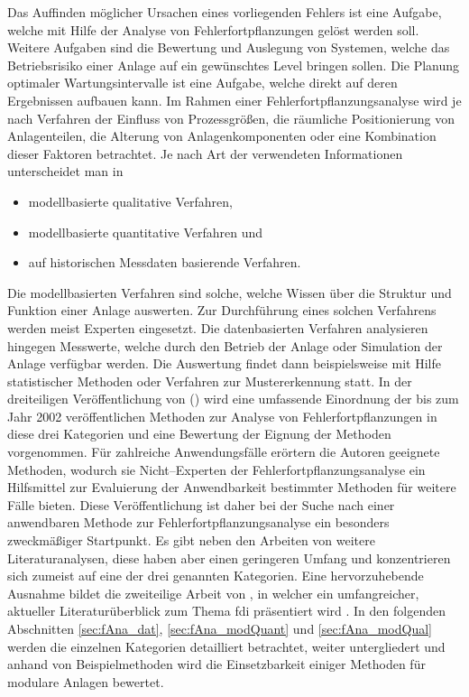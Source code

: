 Das Auffinden m\"oglicher Ursachen eines vorliegenden Fehlers ist eine Aufgabe, welche mit Hilfe der Analyse von Fehlerfortpflanzungen gel\"ost werden soll. Weitere Aufgaben sind die Bewertung und Auslegung von Systemen, welche das Betriebsrisiko einer Anlage auf ein gew\"unschtes Level bringen sollen. Die Planung optimaler Wartungsintervalle ist eine Aufgabe, welche direkt auf deren Ergebnissen aufbauen kann. \newline
Im Rahmen einer Fehlerfortpflanzungsanalyse wird je nach Verfahren der Einfluss von Prozessgr\"o\ss{}en, die r\"aumliche Positionierung von Anlagenteilen, die Alterung von Anlagenkomponenten oder eine Kombination dieser Faktoren betrachtet. Je nach Art der verwendeten Informationen unterscheidet man in \begin{itemize}
\item modellbasierte qualitative Verfahren,
\item modellbasierte quantitative Verfahren und 
\item auf historischen Messdaten basierende Verfahren. 
\end{itemize} 
Die modellbasierten Verfahren sind solche, welche Wissen \"uber die Struktur und Funktion einer Anlage auswerten. Zur Durchf\"uhrung eines solchen Verfahrens werden meist Experten eingesetzt. Die datenbasierten Verfahren analysieren hingegen Messwerte, welche durch den Betrieb der Anlage oder Simulation der Anlage verf\"ugbar werden. Die Auswertung findet dann beispielsweise mit Hilfe statistischer Methoden oder Verfahren zur Mustererkennung statt. \newline
In der dreiteiligen Ver\"offentlichung von \citeauthor{Venkatasubramanian_2003} (\cite{Venkatasubramanian_2003, Venkatasubramanian_2003a,Venkatasubramanian_2003b}) wird eine umfassende Einordnung der bis zum Jahr 2002 ver\"offentlichen Methoden zur Analyse von Fehlerfortpflanzungen in diese drei Kategorien und eine Bewertung der Eignung der Methoden vorgenommen. F\"ur zahlreiche Anwendungsf\"alle er\"ortern die Autoren geeignete Methoden, wodurch sie {Nicht--Ex}perten der Fehlerfortpflanzungsanalyse ein Hilfsmittel zur Evaluierung der Anwendbarkeit bestimmter Methoden f\"ur weitere F\"alle bieten. Diese Ver\"offentlichung ist daher bei der Suche nach einer anwendbaren Methode zur Fehlerfortpflanzungsanalyse ein besonders zweckm\"a\ss{}iger Startpunkt. Es gibt neben den Arbeiten von \citeauthor{Venkatasubramanian_2003} weitere Literaturanalysen, diese haben aber einen geringeren Umfang und konzentrieren sich zumeist auf eine der drei genannten Kategorien. Eine hervorzuhebende Ausnahme bildet die zweiteilige Arbeit von \citeauthor{Gao_2015}, in welcher ein umfangreicher, aktueller Literatur\"uberblick zum Thema \ac{fdi} pr\"asentiert wird \cite{Gao_2015,Gao_2015a}. \newline
In den folgenden Abschnitten \ref{sec:fAna_dat}, \ref{sec:fAna_modQuant} und \ref{sec:fAna_modQual} werden die einzelnen Kategorien detailliert betrachtet, weiter untergliedert und anhand von Beispielmethoden wird die Einsetzbarkeit einiger Methoden f\"ur modulare Anlagen bewertet. 

